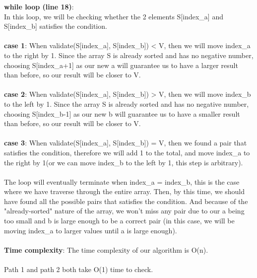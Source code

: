 \documentclass{assignment-373}
\begin{document}
\begin{enumerate}
{  \phantom{=} \phantom{=} \phantom{=} \phantom{=} {\bf while loop (line 18)}:\\
  \phantom{=} \phantom{=} \phantom{=} \phantom{=} \phantom{=} \phantom{=} In this loop, we will be checking whether the 2 elements S[index\_a] and S[index\_b] satisfies the condition.\\
  \\
  \phantom{=} \phantom{=} \phantom{=} \phantom{=} \phantom{=} \phantom{=} {\bf case 1}: When validate(S[index\_a], S[index\_b]) < V, then we will move index\_a to the right by 1. Since the array S is already sorted and has no negative number, choosing S[index\_a+1] as our new a will guarantee us to have a larger result than before, so our result will be closer to V.\\
  \\
  \phantom{=} \phantom{=} \phantom{=} \phantom{=} \phantom{=} \phantom{=} {\bf case 2}: When validate(S[index\_a], S[index\_b]) > V, then we will move index\_b to the left by 1. Since the array S is already sorted and has no negative number, choosing S[index\_b-1] as our new b will guarantee us to have a smaller result than before, so our result will be closer to V.\\
  \\
  \phantom{=} \phantom{=} \phantom{=} \phantom{=} \phantom{=} \phantom{=} {\bf case 3}: When validate(S[index\_a], S[index\_b]) = V, then we found a pair that satisfies the condition, therefore we will add 1 to the total, and move index\_a to the right by 1(or we can move index\_b to the left by 1, this step is arbitrary).\\
  \\
  \phantom{=} \phantom{=} \phantom{=} \phantom{=} The loop will eventually terminate when index\_a = index\_b, this is the case where we have traverse through the entire array. Then, by this time, we should have found all the possible pairs that satisfies the condition. And because of the "already-sorted" nature of the array, we won't miss any pair due to our a being too small and b is large enough to be a correct pair (in this case, we will be moving index\_a to larger values until a is large enough).\\
  \\
  \phantom{=} \phantom{=} {\bf Time complexity}: The time complexity of our algorithm is O(n).\\
  \\
  \phantom{=} \phantom{=} \phantom{=} \phantom{=} Path 1 and path 2 both take O(1) time to check.\\
}
\end{enumerate}
\end{document}
